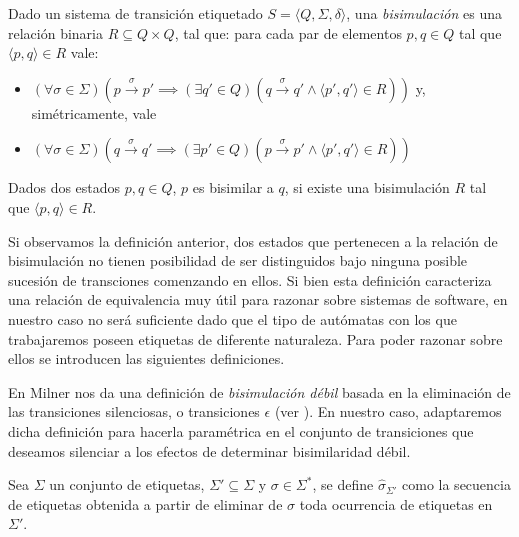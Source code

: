 \begin{definition} \label{def:bisimulación} Dado un sistema de transición etiquetado $ S = \langle Q, \Sigma, \delta \rangle $, una \emph{bisimulación} es una relación binaria $R \subseteq Q \times Q$, tal que: para cada par de elementos $p, q \in Q$ tal que $\langle p, q \rangle \in R$ vale:
\begin{itemize}
    \item $(\forall \sigma \in \Sigma)(p \xrightarrow{\sigma} p' \implies (\exists q' \in Q)(q \xrightarrow{\sigma} q' \land \langle p', q' \rangle \in R))$ y, simétricamente, vale 
    \item $(\forall \sigma \in \Sigma)(q \xrightarrow{\sigma} q' \implies (\exists p' \in Q)(p \xrightarrow{\sigma} p' \land \langle p', q' \rangle \in R))$
\end{itemize}
Dados dos estados $p, q \in Q $, $p$ es bisimilar a $q$, si existe una bisimulación $R$ tal que $\langle p, q \rangle \in R$.
\end{definition}

Si observamos la definición anterior, dos estados que pertenecen a la relación de bisimulación no tienen posibilidad de ser distinguidos bajo ninguna posible sucesión de transciones comenzando en ellos. Si bien esta definición caracteriza una relación de equivalencia muy útil para razonar sobre sistemas de software, en nuestro caso no será suficiente dado que el tipo de autómatas con los que trabajaremos poseen etiquetas de diferente naturaleza. Para poder razonar sobre ellos se introducen las siguientes definiciones.

En \cite[Sec.~5.1, Def.~5]{milner89} Milner nos da una definición de \emph{bisimulación débil} basada en la eliminación de las transiciones silenciosas, o transiciones $\epsilon$ (ver \cite[Defs.~1 a~4]{milner89}). En nuestro caso, adaptaremos dicha definición para hacerla paramétrica en el conjunto de transiciones que deseamos silenciar a los efectos de determinar bisimilaridad débil.

\begin{definition}
Sea $\Sigma$ un conjunto de etiquetas, $\Sigma' \subseteq \Sigma$ y $\sigma \in \Sigma^*$, se define $\widehat{\sigma}_{\Sigma'}$ como la secuencia de etiquetas obtenida a partir de eliminar de $\sigma$ toda ocurrencia de etiquetas en $\Sigma'$.
\end{definition}

